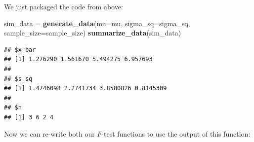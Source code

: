 \documentclass[
]{book}
\newenvironment{Shaded}{\begin{snugshade}}{\end{snugshade}}
\newcommand{\AttributeTok}[1]{\textcolor[rgb]{0.13,0.29,0.53}{#1}}
\newcommand{\ControlFlowTok}[1]{\textcolor[rgb]{0.13,0.29,0.53}{\textbf{#1}}}
\newcommand{\FunctionTok}[1]{\textcolor[rgb]{0.13,0.29,0.53}{\textbf{#1}}}
\newcommand{\NormalTok}[1]{#1}
\newcommand{\OtherTok}[1]{\textcolor[rgb]{0.56,0.35,0.01}{#1}}
\newcommand{\SpecialCharTok}[1]{\textcolor[rgb]{0.81,0.36,0.00}{\textbf{#1}}}
\begin{document}
\begin{Shaded}
\end{Shaded}

We just packaged the code from above:

\begin{Shaded}
\begin{Highlighting}[]
\NormalTok{sim\_data }\OtherTok{=} \FunctionTok{generate\_data}\NormalTok{(}\AttributeTok{mu=}\NormalTok{mu, }\AttributeTok{sigma\_sq=}\NormalTok{sigma\_sq, }\AttributeTok{sample\_size=}\NormalTok{sample\_size)}
\FunctionTok{summarize\_data}\NormalTok{(sim\_data)}
\end{Highlighting}
\end{Shaded}

\begin{verbatim}
## $x_bar
## [1] 1.276290 1.561670 5.494275 6.957693
## 
## $s_sq
## [1] 1.4746098 2.2741734 3.8580826 0.8145309
## 
## $n
## [1] 3 6 2 4
\end{verbatim}

Now we can re-write both our \(F\)-test functions to use the output of this function:
\end{document}
